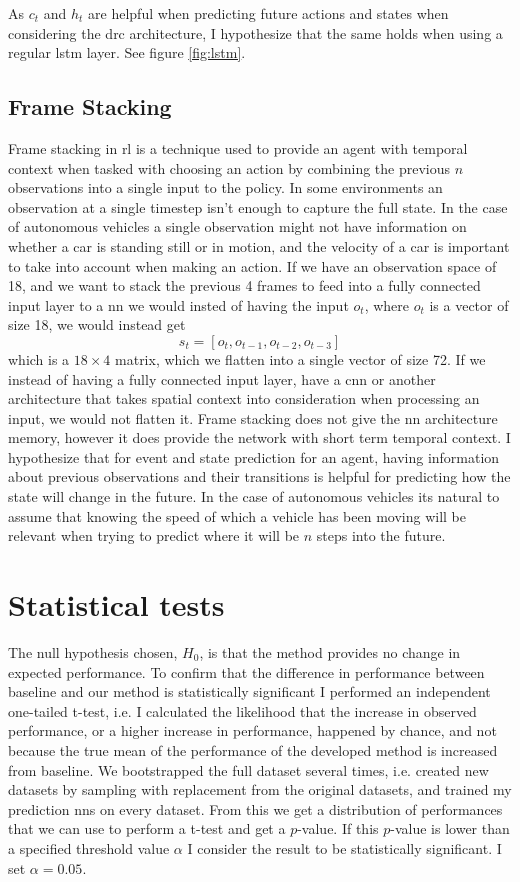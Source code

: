 \documentclass[UKenglish]{uiomasterthesis}
\begin{document}
As $c_t$ and $h_t$ are helpful when predicting future actions and states \cite{chung2024predictingfutureactionsreinforcement} when considering the \ac{drc} architecture, I hypothesize that the same holds when using a regular \ac{lstm} layer. See figure \ref{fig:lstm}.

\subsection{Frame Stacking}
Frame stacking in \ac{rl} is a technique used to provide an agent with temporal context when tasked with choosing an action by combining the previous $n$ observations into a single input to the policy. In some environments an observation at a single timestep isn't enough to capture the full state. In the case of autonomous vehicles a single observation might not have information on whether a car is standing still or in motion, and the velocity of a car is important to take into account when making an action.
If we have an observation space of 18, and we want to stack the previous 4 frames to feed into a fully connected input layer to a \ac{nn} we would insted of having the input $o_t$, where $o_t$ is a vector of size 18, we would instead get $$s_t = [o_t, o_{t-1}, o_{t-2}, o_{t-3}]$$ which is a $18\times4$ matrix, which we flatten into a single vector of size 72. If we instead of having a fully connected input layer, have a \ac{cnn} or another architecture that takes spatial context into consideration when processing an input, we would not flatten it.
Frame stacking does not give the \ac{nn} architecture memory, however it does provide the network with short term temporal context. I hypothesize that for event and state prediction for an agent, having information about previous observations and their transitions is helpful for predicting how the state will change in the future. In the case of autonomous vehicles its natural to assume that knowing the speed of which a vehicle has been moving will be relevant when trying to predict where it will be $n$ steps into the future.

\section{Statistical tests}
The null hypothesis chosen, $H_0$, is that the method provides no change in expected performance. To confirm that the difference in performance between baseline and our method is statistically significant I performed an independent one-tailed t-test, i.e. I calculated the likelihood that the increase in observed performance, or a higher increase in performance, happened by chance, and not because the true mean of the performance of the developed method is increased from baseline.
We bootstrapped the full dataset several times, i.e. created new datasets by sampling with replacement from the original datasets, and trained my prediction \acp{nn} 
on every dataset. From this we get a distribution of performances that we can use to perform a t-test and get a $p$-value. If this $p$-value is lower than a specified threshold value $\alpha$ I consider the result to be statistically significant. I set $\alpha = 0.05$.
\end{document}
